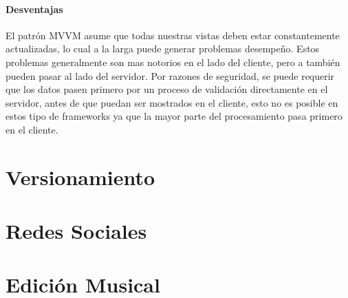 \paragraph{Desventajas}
El patrón MVVM asume que todas nuestras vistas deben estar constantemente
actualizadas, lo cual a la larga puede generar problemas desempeño. Estos
problemas generalmente son mas notorios en el lado del cliente, pero a también
pueden pasar al lado del servidor.
Por razones de seguridad, se puede requerir que los datos
pasen primero por un proceso de validación directamente en el servidor,
antes de que puedan ser mostrados en el cliente, esto no es posible en
estos tipo de frameworks ya que la mayor parte del procesamiento pasa
primero en el cliente.

\section{Versionamiento}
\section{Redes Sociales}
\section{Edición Musical}
